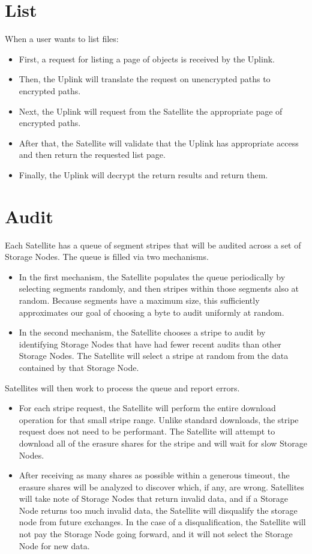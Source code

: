 \documentclass[8pt,fleqn,openany]{book}
\begin{document}
\section{List}

When a user wants to list files:

\begin{itemize}
\item First, a request for listing a page of objects is received by the Uplink.
\item Then, the Uplink will translate the request on unencrypted paths to encrypted
  paths.
\item Next, the Uplink will request from the Satellite the appropriate page of
  encrypted paths.
\item After that, the Satellite will validate that the Uplink has appropriate access
  and then return the requested list page.
\item Finally, the Uplink will decrypt the return results and return them.
\end{itemize}

\section{Audit}

Each Satellite has a queue of segment stripes that will be audited across
  a set of Storage Nodes. The queue is filled via two mechanisms.
  \begin{itemize}
  \item In the first mechanism, the Satellite populates the queue periodically
    by selecting segments randomly, and then stripes within those segments also
    at random. Because segments have a maximum size, this sufficiently
    approximates our goal of choosing a byte to audit uniformly at random.
  \item In the second mechanism, the Satellite chooses a stripe to audit by
    identifying Storage Nodes that have had fewer recent audits than other
    Storage Nodes. The Satellite will select a stripe at random from the data
    contained by that Storage Node.
  \end{itemize}

Satellites will then work to process the queue and report errors.
\begin{itemize}
\item For each stripe request, the Satellite will perform the entire download
  operation for that small stripe range. Unlike standard downloads, the stripe
  request does not need to be performant. The Satellite will attempt to
  download all of the erasure shares for the stripe and will wait for slow
  Storage Nodes.
\item After receiving as many shares as possible within a generous timeout,
  the erasure shares will be analyzed to discover which, if any, are wrong.
  Satellites will take note of Storage Nodes that return invalid data, and if a
  Storage Node returns too much invalid data, the Satellite will disqualify
  the storage node from future exchanges. In the case of a disqualification,
  the Satellite will not pay the Storage Node going forward, and it will not
  select the Storage Node for new data.
\end{itemize}
\end{document}

